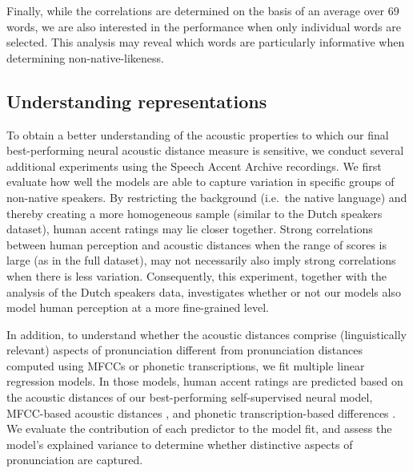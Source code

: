 \documentclass[11pt,a4paper]{article}
\begin{document}
Finally, while the correlations are determined on the basis of an average over 69 words, we are also interested in the performance when only individual words are selected. This analysis may reveal which words are particularly informative when determining non-native-likeness.

\subsection{Understanding representations}
To obtain a better understanding of the acoustic properties to which our final best-performing neural acoustic distance measure is sensitive, we conduct several additional experiments using the Speech Accent Archive recordings. We first evaluate how well the models are able to capture variation in specific groups of non-native speakers. By restricting the background (i.e.~the native language) and thereby creating a more homogeneous sample (similar to the Dutch speakers dataset), human accent ratings may lie closer together. Strong correlations between human perception and acoustic distances when the range of scores is large (as in the full dataset), may not necessarily also imply strong correlations when there is less variation. Consequently, this experiment, together with the analysis of the Dutch speakers data, investigates whether or not our models also model human perception at a more fine-grained level. 

In addition, to understand whether the acoustic distances comprise (linguistically relevant) aspects of pronunciation different from pronunciation distances computed using MFCCs or phonetic transcriptions, we fit multiple linear regression models. In those models, human accent ratings are predicted based on the acoustic distances of our best-performing self-supervised neural model, MFCC-based acoustic distances \citep{acoustic-measure}, and phonetic transcription-based differences \citep{wieling2014a}. We evaluate the contribution of each predictor to the model fit, and assess the model's explained variance to determine whether distinctive aspects of pronunciation are captured.
\end{document}
